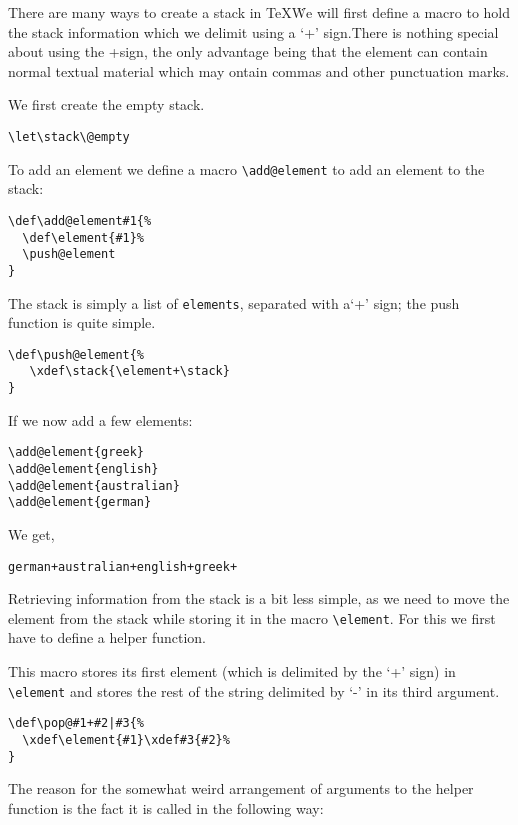 \documentclass{book}
\def\sidenote{}
\begin{document}
There are many ways to create a stack in \TeX\. We will first define a macro to hold the stack information which we delimit using a `+' sign.\sidenote{There is nothing special about using the +sign, the only advantage being that the element can contain normal textual material which may ontain commas and other punctuation marks.}

We first create the empty stack.

\begin{verbatim}
\let\stack\@empty
\end{verbatim}
\let\stack\@empty

To add an element we define a macro \verb+\add@element+ to add an element to the stack:

\begin{verbatim}
\def\add@element#1{%
  \def\element{#1}%
  \push@element
}
\end{verbatim}
\def\add@element#1{%
  \def\element{#1}%
  \push@element
}

The stack is simply a list of \texttt{elements}, separated with a`+' sign; the push function is quite simple.

\begin{verbatim}
\def\push@element{%
   \xdef\stack{\element+\stack}
}
\end{verbatim}
\def\push@element{%
   \xdef\stack{\element+\stack}
}

If we now add a few elements:
\add@element{greek}
\add@element{english}
\add@element{australian}
\add@element{german}
\begin{verbatim}
\add@element{greek}
\add@element{english}
\add@element{australian}
\add@element{german}
\end{verbatim}
We get,

\texttt{\stack}

Retrieving information from the stack is a bit less simple, as we need to move the element from the stack while storing it in the macro \verb+\element+. For this we first have to define a helper function.

This macro stores its first element (which is delimited by the `+' sign) in \verb+\element+ and stores the rest of the string delimited by `-' in its third argument.
\begin{verbatim}
\def\pop@#1+#2|#3{%
  \xdef\element{#1}\xdef#3{#2}%
}
\end{verbatim}
\def\pop@#1+#2|#3{%
  \xdef\element{#1}\xdef#3{#2}%
}
The reason for the somewhat weird arrangement of arguments to the helper function is the fact it is called in the following way:
\end{document}
